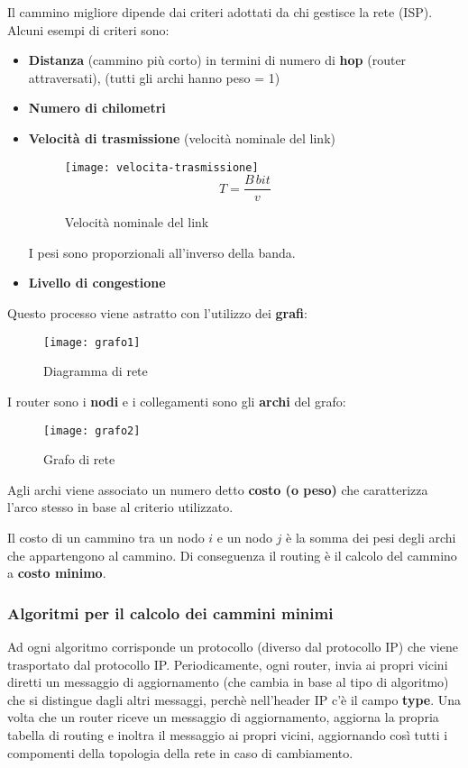 \documentclass[a4paper]{article}
\begin{document}
\noindent
Il cammino migliore dipende dai criteri adottati da chi gestisce la rete (ISP).
Alcuni esempi di criteri sono:
\begin{itemize}
  \item 
    \textbf{Distanza} (cammino più corto) in termini di
    numero di \textbf{hop} (router attraversati), (tutti gli archi hanno peso = 1)

  \item \textbf{Numero di chilometri}

  \item \textbf{Velocità di trasmissione} (velocità nominale del link)
    \begin{figure}[H]
      \centering
      \texttt{[image: velocita-trasmissione]}
      \[
        T = \frac{B\,bit}{v}
      \]
      \caption{Velocità nominale del link}
    \end{figure}
    I pesi sono proporzionali all'inverso della banda.

  \item \textbf{Livello di congestione}
\end{itemize}
Questo processo viene astratto con l'utilizzo dei \textbf{grafi}:
\begin{figure}[H]
  \centering
  \texttt{[image: grafo1]}
  \caption{Diagramma di rete}
\end{figure}
\noindent
I router sono i \textbf{nodi} e i collegamenti sono gli \textbf{archi} del grafo:
\begin{figure}[H]
  \centering
  \texttt{[image: grafo2]}
  \caption{Grafo di rete}
\end{figure}
\noindent
Agli archi viene associato un numero detto \textbf{costo (o peso)} che caratterizza
l'arco stesso in base al criterio utilizzato.

\begin{definition}
  Il costo di un cammino tra un nodo \( i \) e un nodo \( j \) è la somma dei pesi degli
  archi che appartengono al cammino. Di conseguenza il routing è il calcolo del cammino
  a \textbf{costo minimo}.
\end{definition}

\subsubsection{Algoritmi per il calcolo dei cammini minimi}
Ad ogni algoritmo corrisponde un protocollo (diverso dal protocollo IP) che viene
trasportato dal protocollo IP. Periodicamente, ogni router, invia ai propri vicini
diretti un messaggio di aggiornamento (che cambia in base al tipo di algoritmo) che si 
distingue dagli altri messaggi, perchè nell'header IP c'è il campo \textbf{type}. Una
volta che un router riceve un messaggio di aggiornamento, aggiorna la propria tabella
di routing e inoltra il messaggio ai propri vicini, aggiornando così tutti i compomenti
della topologia della rete in caso di cambiamento.
\end{document}
